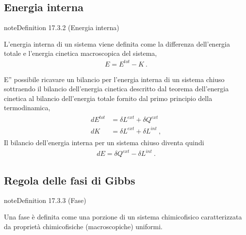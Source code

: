 \documentclass[letterpaper,10pt,italian]{jupyterBook}
\begin{document}
\subsection{Energia interna}
\label{\detokenize{ch/thermodynamics/principles-gibbs-phase-rule:energia-interna}}\label{\detokenize{ch/thermodynamics/principles-gibbs-phase-rule:physics-hs-thermodynamics-foundation-principles-gibbs-phase-rule-internal-energy}}\label{ch/thermodynamics/principles-gibbs-phase-rule:definition-2}
\begin{sphinxadmonition}{note}{Definition 17.3.2 (Energia interna)}



\sphinxAtStartPar
L’energia interna di un sistema viene definita come la differenza dell’energia totale e l’energia cinetica macroscopica del sistema,
\begin{equation*}
\begin{split}E = E^{tot} - K \ .\end{split}
\end{equation*}\end{sphinxadmonition}

\sphinxAtStartPar
E” possibile ricavare un bilancio per l’energia interna di un sistema chiuso sottraendo il bilancio dell’energia cinetica descritto dal teorema dell’energia cinetica al bilancio dell’energia totale fornito dal primo principio della termodinamica,
\begin{equation*}
\begin{split}\begin{aligned}
  d E^{tot} & = \delta L^{ext} + \delta Q^{ext} \\
  d K       & = \delta L^{ext} + \delta L^{int} \ ,
\end{aligned}\end{split}
\end{equation*}
\sphinxAtStartPar
Il bilancio dell’energia interna per un sistema chiuso diventa quindi
\begin{equation*}
\begin{split}d E = \delta Q^{ext} - \delta L^{int} \ .\end{split}
\end{equation*}

\subsection{Regola delle fasi di Gibbs}
\label{\detokenize{ch/thermodynamics/principles-gibbs-phase-rule:regola-delle-fasi-di-gibbs}}\label{\detokenize{ch/thermodynamics/principles-gibbs-phase-rule:physics-hs-thermodynamics-foundation-principles-gibbs-phase-rule-gibbs-phase-rule}}\label{ch/thermodynamics/principles-gibbs-phase-rule:definition-3}
\begin{sphinxadmonition}{note}{Definition 17.3.3 (Fase)}



\sphinxAtStartPar
Una fase è definita come una porzione di un sistema chimico\sphinxhyphen{}fisico caratterizzata da proprietà chimico\sphinxhyphen{}fisiche (macroscopiche) uniformi.
\end{sphinxadmonition}
\end{document}
